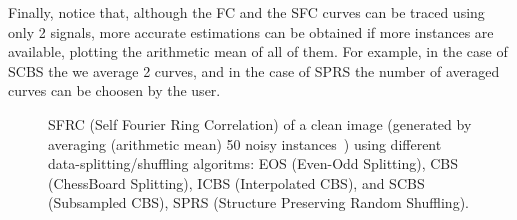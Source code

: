 \documentclass{article}
\begin{document}
Finally, notice that, although the FC and the SFC curves can be traced
using only 2 signals, more accurate estimations can be obtained if
more instances are available, plotting the arithmetic mean of all of
them. For example, in the case of SCBS the we average 2 curves, and in
the case of SPRS the number of averaged curves can be choosen by the
user.

\begin{figure}
  \centering
  \caption{SFRC (Self Fourier Ring Correlation) of a clean image
    (generated by averaging (arithmetic mean) 50 noisy
    instances~\cite{zhang2019poisson}) using different
    data-splitting/shuffling algoritms: EOS (Even-Odd Splitting), CBS
    (ChessBoard Splitting), ICBS (Interpolated CBS), and SCBS
    (Subsampled CBS), SPRS (Structure Preserving Random
    Shuffling).\label{fig:SFC_vs_splitting_clean}}
\end{figure}
\end{document}
